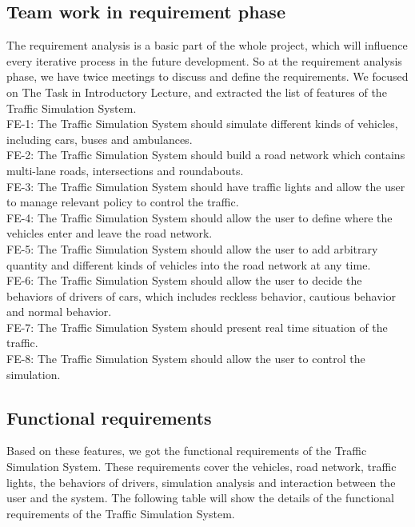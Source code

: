 \documentclass[a4paper,12pt]{article}
\begin{document}
\subsection{Team work in requirement phase} The requirement analysis is a basic part of the whole project, which will influence every iterative process in the future development. So at the requirement analysis phase, we have twice meetings to discuss and define the requirements. We focused on The Task in Introductory Lecture, and extracted the list of features of the Traffic Simulation System. \\
FE-1: The Traffic Simulation System should simulate different kinds of vehicles, including cars, buses and ambulances.\\
FE-2: The Traffic Simulation System should build a road network which contains multi-lane roads, intersections and roundabouts.\\
FE-3: The Traffic Simulation System should have traffic lights and allow the user to manage relevant policy to control the traffic.\\
FE-4: The Traffic Simulation System should allow the user to define where the vehicles enter and leave the road network.\\
FE-5: The Traffic Simulation System should allow the user to add arbitrary quantity and different kinds of vehicles into the road network at any time.\\
FE-6: The Traffic Simulation System should allow the user to decide the behaviors of drivers of cars, which includes reckless behavior, cautious behavior and normal behavior.\\
FE-7: The Traffic Simulation System should present real time situation of the traffic.\\
FE-8: The Traffic Simulation System should allow the user to control the simulation.\\

\subsection{Functional requirements}  Based on these features, we got the functional requirements of the Traffic Simulation System. These requirements cover the vehicles, road network, traffic lights, the behaviors of drivers, simulation analysis and interaction between the user and the system. The following table will show the details of the functional requirements of the Traffic Simulation System.
\end{document}
